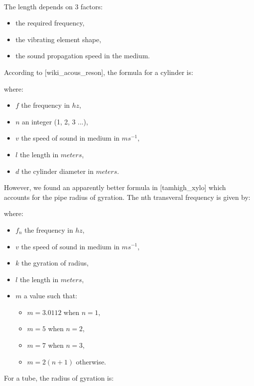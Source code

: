 \documentclass[12pt]{article}
\begin{document}
\paragraph{} The length depends on 3 factors:
\begin{itemize}
  \item the required frequency,
  \item the vibrating element shape,
  \item the sound propagation speed in the medium.
\end{itemize}
According to [wiki\_acous\_reson], the formula for a cylinder is:
\begin{center}
\end{center}
where:
\begin{itemize}
  \item $f$ the frequency in $hz$,
  \item $n$ an integer (1, 2, 3 ...),
  \item $v$ the speed of sound in medium in $ms^{-1}$,
  \item $l$ the length in $meters$,
  \item $d$ the cylinder diameter in $meters$.
\end{itemize}
However, we found an apparently better formula in [tamhigh\_xylo]
which accounts for the pipe radius of gyration. The nth transveral
frequency is given by:
\begin{center}
\end{center}
where:
\begin{itemize}
  \item $f_{n}$ the frequency in $hz$,
  \item $v$ the speed of sound in medium in $ms^{-1}$,
  \item $k$ the gyration of radius,
  \item $l$ the length in $meters$,
  \item $m$ a value such that:
    \begin{itemize}
      \item $m = 3.0112$ when $n = 1$,
      \item $m = 5$ when $n = 2$,
      \item $m = 7$ when $n = 3$,
      \item $m = 2(n + 1)$ otherwise.
    \end{itemize}
\end{itemize}
For a tube, the radius of gyration is:
\end{document}
